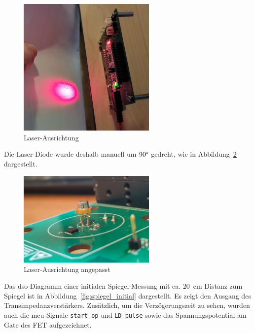 \begin{figure}[H]
    \centering
    \includegraphics[width=0.6\textwidth]{graphics/laser_ausrichtung.jpg}
    \caption{Laser-Ausrichtung}\label{fig:laser_ausrichtung}
\end{figure}

Die Laser-Diode wurde deshalb manuell um $90\degree$ gedreht, wie in Abbildung~\ref{fig:laser_ausrichtung_angepasst}
dargestellt.

\begin{figure}[H]
    \centering
    \includegraphics[width=0.6\textwidth]{graphics/laser_ausrichtung_angepasst.jpg}
    \caption{Laser-Ausrichtung angepasst}\label{fig:laser_ausrichtung_angepasst}
\end{figure}

Das \acrshort{dso}-Diagramm einer initialen Spiegel-Messung mit ca. 20~cm Distanz zum Spiegel ist in
Abbildung~\ref{fig:spiegel_initial} dargestellt. Es zeigt den Ausgang des Transimpedanzverstärkers. Zusätzlich, um die
Verzögerungszeit zu sehen, wurden auch die \acrshort{mcu}-Signale \lstinline|start_op| und \lstinline|LD_pulse| sowie
das Spannungspotential am Gate des FET aufgezeichnet.

